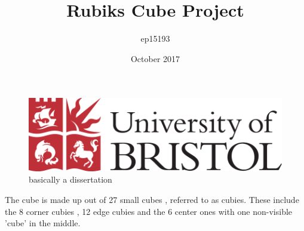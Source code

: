 \documentclass{article}
\author{ep15193}
\title{Rubiks Cube Project}\vspace{-50pt}
\date{October 2017}
\begin{document}
\maketitle
\begin{figure}[h]
\centering
\includegraphics[scale=.5]{uob.png}
\caption{basically a dissertation}
\end{figure}
\newpage
\tableofcontents
\newpage

\medskip
The cube is made up out of 27 small cubes , referred to as cubies. These include the 8 corner cubies , 12 edge cubies and the 6 center ones with one non-visible 'cube' in the middle.
\vspace{-20pt}
\begin{figure}[h]
{
	\hspace{-10cm}
}
\end{figure}
\end{document}

